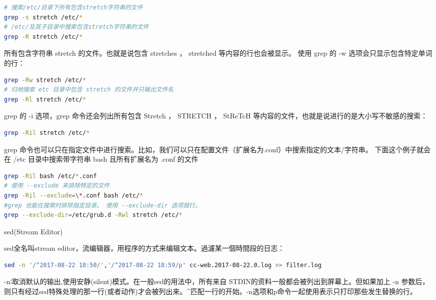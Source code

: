 \documentclass[12pt]{book}
\makeatletter
\numberwithin{dummy}{section}
\theoremstyle{ocrenumbox}
\theoremstyle{blacknumex}
\theoremstyle{blacknumbox}
\theoremstyle{ocrenum}
\renewcommand\paragraph{\@startsection{paragraph}{4}{\z@}
	{-2ex \@plus-.2ex \@minus .2ex}
	{.1ex}
	{\normalfont\small\sffamily\bfseries}}
\makeatother
\begin{document}
\begin{lstlisting}[language=Bash]
# 搜索/etc/目录下所有包含stretch字符串的文件
grep -s stretch /etc/*
# /etc/及其子目录中搜索包含stretch字符串的文件
grep -R stretch /etc/*
\end{lstlisting}

所有包含字符串 stretch 的文件。也就是说包含 stretches ， stretched 等内容的行也会被显示。 使用 grep 的 -w 选项会只显示包含特定单词的行：

\begin{lstlisting}[language=Bash]
grep -Rw stretch /etc/*
# 归地搜索 etc 目录中包含 stretch 的文件并只输出文件名
grep -Rl stretch /etc/*
\end{lstlisting}

grep 的 -i 选项，grep 命令还会列出所有包含 Stretch ， STRETCH ， StReTcH 等内容的文件，也就是说进行的是大小写不敏感的搜索：

\begin{lstlisting}[language=Bash]
grep -Ril stretch /etc/*
\end{lstlisting}

grep 命令也可以只在指定文件中进行搜索。比如，我们可以只在配置文件（扩展名为.conf）中搜索指定的文本/字符串。 下面这个例子就会在 /etc 目录中搜索带字符串 bash 且所有扩展名为 .conf 的文件

\begin{lstlisting}[language=Bash]
grep -Ril bash /etc/*.conf
# 使用 --exclude 来排除特定的文件
grep -Ril --exclude=\*.conf bash /etc/*
#grep 也能在搜索时排除指定目录。 使用 --exclude-dir 选项就行。
grep --exclude-dir=/etc/grub.d -Rwl stretch /etc/*
\end{lstlisting}


\paragraph{sed(Stream Editor)}

sed全名叫stream editor，流编辑器，用程序的方式来编辑文本。過濾某一個時間段的日志：

\begin{lstlisting}[language=Bash]
sed -n '/^2017-08-22 18:50/','/^2017-08-22 18:59/p' cc-web.2017-08-22.0.log >> filter.log
\end{lstlisting}

-n∶取消默认的输出,使用安静(silent)模式。在一般sed的用法中，所有来自 STDIN的资料一般都会被列出到屏幕上。但如果加上 -n 参数后，则只有经过sed特殊处理的那一行(或者动作)才会被列出来。\^{}匹配一行的开始。-n选项和p命令一起使用表示只打印那些发生替换的行。
\end{document}
